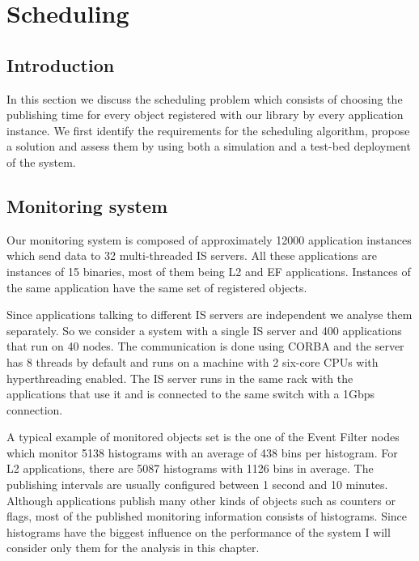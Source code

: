 \chapter{Scheduling} %
\label{Capitolul4}

\section{Introduction}

In this section we discuss the scheduling problem which consists of choosing the publishing time for every object registered with our library by every application instance. We first identify the requirements for the scheduling algorithm, propose a solution and assess them by using both a simulation and a test-bed deployment of the system.

\section{Monitoring system}

Our monitoring system is composed of approximately 12000 application instances which send data to 32 multi-threaded IS servers.  All these applications are instances of 15 binaries, most of them being L2 and EF applications. Instances of the same application have the same set of registered objects.

Since applications talking to different IS servers are independent we analyse them separately. So we consider a system with a single IS server and 400 applications that run on 40 nodes. The communication is done using CORBA \citep{vinoski1997corba} and the server has 8 threads by default and runs on a machine with 2 six-core CPUs with hyperthreading enabled. The IS server runs in the same rack with the applications that use it and is connected to the same switch with a 1Gbps connection.

A typical example of monitored objects set is the one of the Event Filter nodes which monitor 5138 histograms with an average of 438 bins per histogram. For L2 applications, there are 5087 histograms with 1126 bins in average. The publishing intervals are usually configured between 1 second and 10 minutes. Although applications publish many other kinds of objects such as counters or flags, most of the published monitoring information consists of histograms. Since histograms have the biggest influence on the performance of the system I will consider only them for the analysis in this chapter.

